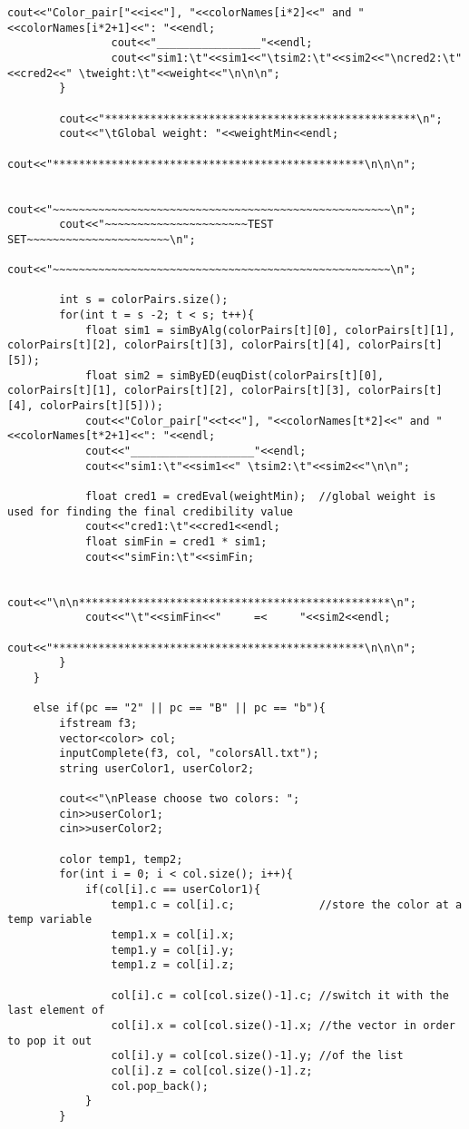 \begin{lstlisting}[caption=The C++ implementation of the application concerning colors, breaklines=true]
				cout<<"Color_pair["<<i<<"], "<<colorNames[i*2]<<" and "<<colorNames[i*2+1]<<": "<<endl;
				cout<<"________________"<<endl;
				cout<<"sim1:\t"<<sim1<<"\tsim2:\t"<<sim2<<"\ncred2:\t"<<cred2<<" \tweight:\t"<<weight<<"\n\n\n";
		}

		cout<<"************************************************\n";
		cout<<"\tGlobal weight: "<<weightMin<<endl;
		cout<<"************************************************\n\n\n";

		cout<<"~~~~~~~~~~~~~~~~~~~~~~~~~~~~~~~~~~~~~~~~~~~~~~~~~~~~\n";
		cout<<"~~~~~~~~~~~~~~~~~~~~~~TEST SET~~~~~~~~~~~~~~~~~~~~~~\n";
		cout<<"~~~~~~~~~~~~~~~~~~~~~~~~~~~~~~~~~~~~~~~~~~~~~~~~~~~~\n";

		int s = colorPairs.size();
		for(int t = s -2; t < s; t++){
			float sim1 = simByAlg(colorPairs[t][0], colorPairs[t][1], colorPairs[t][2], colorPairs[t][3], colorPairs[t][4], colorPairs[t][5]);
			float sim2 = simByED(euqDist(colorPairs[t][0], colorPairs[t][1], colorPairs[t][2], colorPairs[t][3], colorPairs[t][4], colorPairs[t][5]));
			cout<<"Color_pair["<<t<<"], "<<colorNames[t*2]<<" and "<<colorNames[t*2+1]<<": "<<endl;
			cout<<"___________________"<<endl;
			cout<<"sim1:\t"<<sim1<<" \tsim2:\t"<<sim2<<"\n\n";

			float cred1 = credEval(weightMin);	//global weight is used for finding the final credibility value
			cout<<"cred1:\t"<<cred1<<endl;
			float simFin = cred1 * sim1;
			cout<<"simFin:\t"<<simFin;

			cout<<"\n\n************************************************\n";
			cout<<"\t"<<simFin<<"     =<     "<<sim2<<endl;
			cout<<"************************************************\n\n\n";
		}
	}

	else if(pc == "2" || pc == "B" || pc == "b"){
		ifstream f3;
		vector<color> col;
		inputComplete(f3, col, "colorsAll.txt");
		string userColor1, userColor2;

		cout<<"\nPlease choose two colors: ";
		cin>>userColor1;
		cin>>userColor2;

		color temp1, temp2;
		for(int i = 0; i < col.size(); i++){
			if(col[i].c == userColor1){
				temp1.c = col[i].c;				//store the color at a temp variable
				temp1.x = col[i].x;
				temp1.y = col[i].y;
				temp1.z = col[i].z;

				col[i].c = col[col.size()-1].c;	//switch it with the last element of
				col[i].x = col[col.size()-1].x;	//the vector in order to pop it out
				col[i].y = col[col.size()-1].y;	//of the list
				col[i].z = col[col.size()-1].z;
				col.pop_back();
			}
		}


\end{lstlisting}
